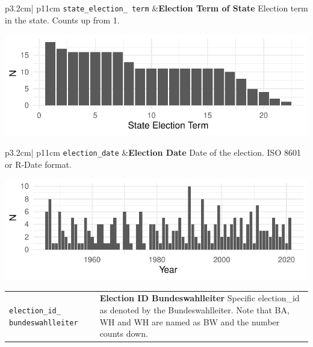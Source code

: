 \documentclass[
]{article}
\begin{document}
\begin{longtable}{p{3.2cm}| p{11cm}}
\texttt{state\_election\_
term} &\textbf{Election Term of State}\newline 
Election term in the state. Counts up from 1.



\hspace*{.25cm}
\begin{minipage}[t]{\linewidth }
\vspace{0pt}
\includegraphics[width = \linewidth]{cbelec/electiontermplot.pdf}
\end{minipage}





\end{longtable}

\begin{longtable}{p{3.2cm}| p{11cm}}
\texttt{election\_date} &\textbf{Election Date}\newline 
Date of the election.  ISO 8601 or R-Date format.

\hspace*{.25cm}
\begin{minipage}[t]{\linewidth }
\vspace{0pt}
\includegraphics[width = \linewidth]{cbelec/electiondatesplot.pdf}
\end{minipage}


\end{longtable}

\begin{longtable}{p{3.2cm}| p{11cm}}
\texttt{election\_id\_
bundeswahlleiter} &\textbf{Election ID Bundeswahlleiter}\newline 
Specific election\_id as denoted by the Bundeswahlleiter.
           Note that BA, WH and WH are named as BW and the number counts down.
\end{longtable}
\end{document}
